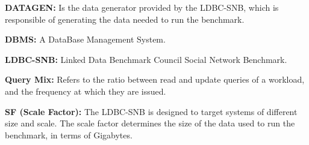 

%
%
%
%
%
%
%
%
%
%


{\flushleft \textbf{DATAGEN:}} Is the data generator provided by the LDBC-SNB, which
is responsible of generating the data needed to run the benchmark.

{\flushleft \textbf{DBMS:}} A DataBase Management System. 

{\flushleft \textbf{LDBC-SNB:}} Linked Data Benchmark Council Social Network Benchmark. 

{\flushleft \textbf{Query Mix:}} Refers to the ratio between read and update queries
of a workload, and the frequency at which they are issued.

{\flushleft \textbf{SF (Scale Factor):}} The LDBC-SNB is designed to target systems of
different size and scale. The scale factor determines the size of the data used
to run the benchmark, in terms of Gigabytes.


